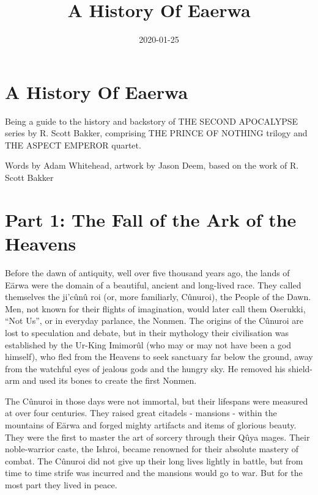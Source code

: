 \documentclass[]{book}
\title{A History Of Eaerwa}
\author{}
\date{2020-01-25}
\begin{document}
\maketitle

{
\setcounter{tocdepth}{1}
\tableofcontents
}
\hypertarget{a-history-of-eaerwa}{%
\chapter{A History Of Eaerwa}\label{a-history-of-eaerwa}}

Being a guide to the history and backstory of THE SECOND APOCALYPSE series by R. Scott Bakker, comprising THE PRINCE OF NOTHING trilogy and THE ASPECT EMPEROR quartet.

Words by Adam Whitehead, artwork by Jason Deem, based on the work of R. Scott Bakker

\hypertarget{part-1-the-fall-of-the-ark-of-the-heavens}{%
\chapter{Part 1: The Fall of the Ark of the Heavens}\label{part-1-the-fall-of-the-ark-of-the-heavens}}

Before the dawn of antiquity, well over five thousand years ago, the lands of Eärwa were the domain of a beautiful, ancient and long-lived race. They called themselves the ji'cûnû roi (or, more familiarly, Cûnuroi), the People of the Dawn. Men, not known for their flights of imagination, would later call them Oserukki, ``Not Us'', or in everyday parlance, the Nonmen. The origins of the Cûnuroi are lost to speculation and debate, but in their mythology their civilisation was established by the Ur-King Imimorûl (who may or may not have been a god himself), who fled from the Heavens to seek sanctuary far below the ground, away from the watchful eyes of jealous gods and the hungry sky. He removed his shield-arm and used its bones to create the first Nonmen.

The Cûnuroi in those days were not immortal, but their lifespans were measured at over four centuries. They raised great citadels - mansions - within the mountains of Eärwa and forged mighty artifacts and items of glorious beauty. They were the first to master the art of sorcery through their Qûya mages. Their noble-warrior caste, the Ishroi, became renowned for their absolute mastery of combat. The Cûnuroi did not give up their long lives lightly in battle, but from time to time strife was incurred and the mansions would go to war. But for the most part they lived in peace.
\end{document}
